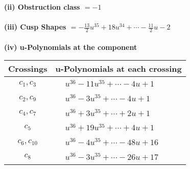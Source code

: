\documentclass[1p]{elsarticle_modified}
\theoremstyle{definition}
\begin{document}
\flushleft \textbf{(ii) Obstruction class $= -1$}\\~\\
\flushleft \textbf{(iii) Cusp Shapes $= -\frac{13}{2} u^{35}+18 u^{34}+\cdots-\frac{11}{2} u-2$}\\~\\
\newpage\renewcommand{\arraystretch}{1}
\flushleft \textbf{(iv) u-Polynomials at the component}\newline \\
\begin{tabular}{m{50pt}|m{274pt}}
Crossings & \hspace{64pt}u-Polynomials at each crossing \\
\hline $$\begin{aligned}c_{1},c_{3}\end{aligned}$$&$\begin{aligned}
&u^{36}-11 u^{35}+\cdots-4 u+1
\end{aligned}$\\
\hline $$\begin{aligned}c_{2},c_{9}\end{aligned}$$&$\begin{aligned}
&u^{36}-3 u^{35}+\cdots-4 u+1
\end{aligned}$\\
\hline $$\begin{aligned}c_{4},c_{7}\end{aligned}$$&$\begin{aligned}
&u^{36}+3 u^{35}+\cdots+2 u+1
\end{aligned}$\\
\hline $$\begin{aligned}c_{5}\end{aligned}$$&$\begin{aligned}
&u^{36}+19 u^{35}+\cdots+4 u+1
\end{aligned}$\\
\hline $$\begin{aligned}c_{6},c_{10}\end{aligned}$$&$\begin{aligned}
&u^{36}-4 u^{35}+\cdots-48 u+16
\end{aligned}$\\
\hline $$\begin{aligned}c_{8}\end{aligned}$$&$\begin{aligned}
&u^{36}-3 u^{35}+\cdots-26 u+17
\end{aligned}$\\
\hline
\end{tabular}\\~\\
\end{document}
